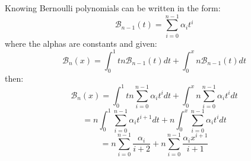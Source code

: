 \documentclass{article}
\begin{document}
\noindent
Knowing Bernoulli polynomials can be written in the form:
	$$\mathcal{B}_{n-1}(t) = \sum_{i=0}^{n-1} \alpha_i t^i$$
where the alphas are constants and given:
	$$\mathcal{B}_n(x) = \int_{0}^{1} tn\mathcal{B}_{n-1}(t)dt + \int_{0}^{x} n\mathcal{B}_{n-1}(t)dt$$
then:
	$$\mathcal{B}_n(x) = \int_{0}^{1} tn\sum_{i=0}^{n-1} \alpha_i t^idt + \int_{0}^{x} n\sum_{i=0}^{n-1} \alpha_i t^idt$$
	$$= n\int_{0}^{1} \sum_{i=0}^{n-1} \alpha_i t^{i+1}dt + n\int_{0}^{x} \sum_{i=0}^{n-1} \alpha_i t^idt$$
	$$=n\sum_{i=0}^{n-1} \frac{\alpha_i}{i+2} + n\sum_{i=0}^{n-1} \frac{\alpha_ix^{i+1}}{i+1}$$
\end{document}
